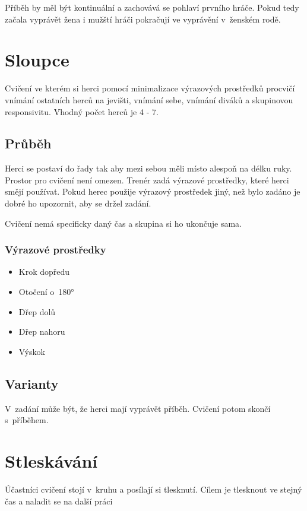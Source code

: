 Příběh by měl být kontinuální a zachovává se pohlaví prvního hráče. Pokud tedy začala vyprávět žena i mužští hráči pokračují ve vyprávění v~ženském rodě. 
 
 
\needspace{5cm} \section{Sloupce} \label{sloupce} Cvičení ve kterém si herci pomocí minimalizace výrazových prostředků procvičí vnímání ostatních herců na jevišti, vnímání sebe, vnímání diváků a skupinovou responsivitu. Vhodný počet herců je 4 - 7. 
 
\subsection{ Průběh }  
Herci se postaví do řady tak aby mezi sebou měli místo alespoň na délku ruky. Prostor pro cvičení není omezen. Trenér zadá výrazové prostředky, které herci smějí používat. Pokud herec použije výrazový prostředek jiný, než bylo zadáno je dobré ho upozornit, aby se držel zadání. 
 
Cvičení nemá specificky daný čas a skupina si ho ukončuje sama. 
 
\subsubsection{ Výrazové prostředky }  
\begin{itemize}
\item  Krok dopředu
\item  Otočení o~180°
\item  Dřep dolů
\item  Dřep nahoru
\item  Výskok
\end{itemize}
 
\subsection{ Varianty } V~zadání může být, že herci mají vyprávět příběh. Cvičení potom skončí s~příběhem. 
 
 
 
 
 
\needspace{5cm} \section{Stleskávání} \label{stleskávání} Účastníci cvičení stojí v~kruhu a posílají si tlesknutí. Cílem je tlesknout ve stejný čas a naladit se na další práci 
 
